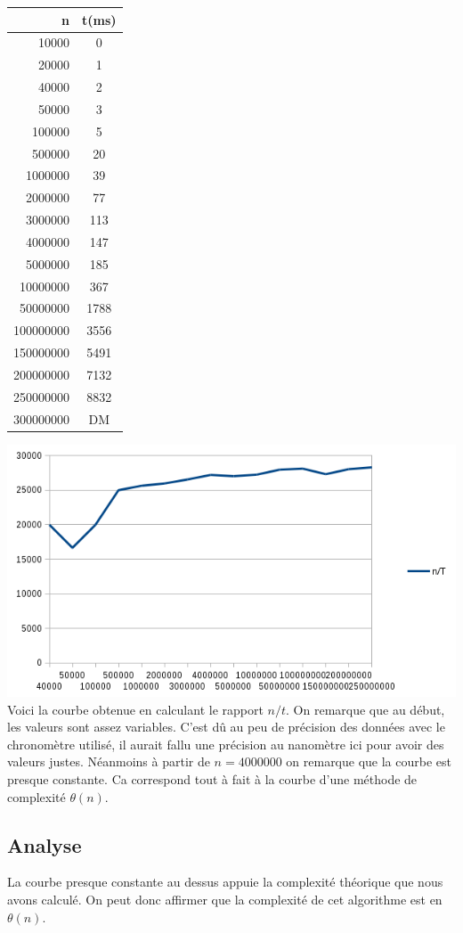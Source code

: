\documentclass[a4paper, 12pt]{article}
\begin{document}
\begin{minipage}[c]{0.4\linewidth}
\begin{tabular}{|r|c|}
\hline
n & t(ms) \\
\hline
10000 &	0\\
20000 &	1\\
40000& 	2\\
50000 &	3\\
100000 &	5\\
500000	 & 20\\
1000000& 	39 \\
2000000&	77\\
3000000&	113\\
4000000&	147\\
5000000&	185\\
10000000&	367\\
50000000&	1788\\
100000000&	3556\\
150000000&	5491\\
200000000&	7132\\
250000000&	8832\\
300000000& DM\\
\hline
\end{tabular}
\end{minipage}\hfill
\begin{minipage}[c]{0.6\linewidth}
	\includegraphics[scale=0.6]{curve_algo_4.png}
	 	Voici la courbe obtenue en calculant le rapport $n/t$. 
		On remarque que au début, les valeurs sont assez variables. C'est dû au peu de précision des données avec le chronomètre utilisé, il aurait fallu une précision au nanomètre ici pour avoir des valeurs justes.
		Néanmoins à partir de $n=4 000 000$ on remarque que la courbe est presque constante. 
		Ca correspond tout à fait à la courbe d'une méthode de complexité $\theta(n)$.
\end{minipage}
\subsection{Analyse}
La courbe presque constante au dessus appuie la complexité théorique que nous avons calculé. On peut donc affirmer que la complexité de cet algorithme est en $\theta(n)$. 
\end{document}
